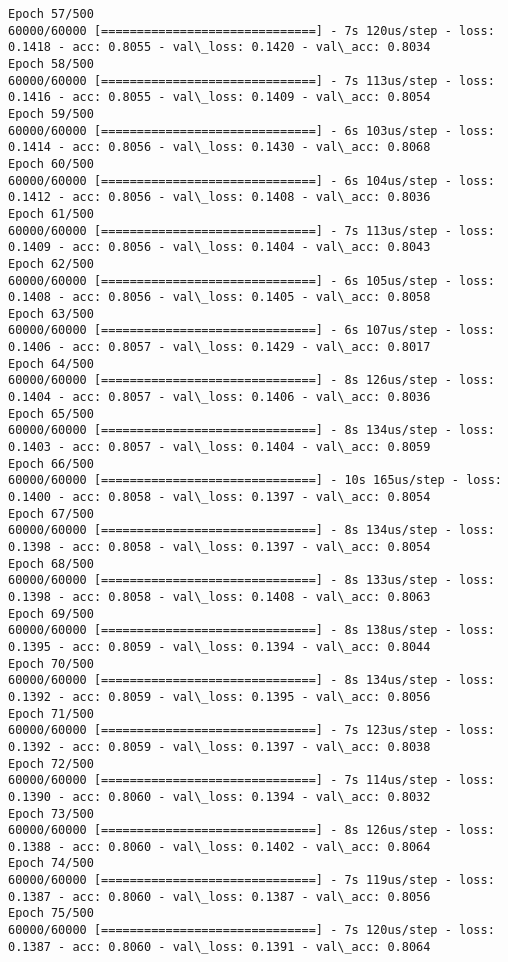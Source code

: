 \documentclass[11pt]{article}
\begin{document}
\begin{Verbatim}[commandchars=\\\{\}]
Epoch 57/500
60000/60000 [==============================] - 7s 120us/step - loss: 0.1418 - acc: 0.8055 - val\_loss: 0.1420 - val\_acc: 0.8034
Epoch 58/500
60000/60000 [==============================] - 7s 113us/step - loss: 0.1416 - acc: 0.8055 - val\_loss: 0.1409 - val\_acc: 0.8054
Epoch 59/500
60000/60000 [==============================] - 6s 103us/step - loss: 0.1414 - acc: 0.8056 - val\_loss: 0.1430 - val\_acc: 0.8068
Epoch 60/500
60000/60000 [==============================] - 6s 104us/step - loss: 0.1412 - acc: 0.8056 - val\_loss: 0.1408 - val\_acc: 0.8036
Epoch 61/500
60000/60000 [==============================] - 7s 113us/step - loss: 0.1409 - acc: 0.8056 - val\_loss: 0.1404 - val\_acc: 0.8043
Epoch 62/500
60000/60000 [==============================] - 6s 105us/step - loss: 0.1408 - acc: 0.8056 - val\_loss: 0.1405 - val\_acc: 0.8058
Epoch 63/500
60000/60000 [==============================] - 6s 107us/step - loss: 0.1406 - acc: 0.8057 - val\_loss: 0.1429 - val\_acc: 0.8017
Epoch 64/500
60000/60000 [==============================] - 8s 126us/step - loss: 0.1404 - acc: 0.8057 - val\_loss: 0.1406 - val\_acc: 0.8036
Epoch 65/500
60000/60000 [==============================] - 8s 134us/step - loss: 0.1403 - acc: 0.8057 - val\_loss: 0.1404 - val\_acc: 0.8059
Epoch 66/500
60000/60000 [==============================] - 10s 165us/step - loss: 0.1400 - acc: 0.8058 - val\_loss: 0.1397 - val\_acc: 0.8054
Epoch 67/500
60000/60000 [==============================] - 8s 134us/step - loss: 0.1398 - acc: 0.8058 - val\_loss: 0.1397 - val\_acc: 0.8054
Epoch 68/500
60000/60000 [==============================] - 8s 133us/step - loss: 0.1398 - acc: 0.8058 - val\_loss: 0.1408 - val\_acc: 0.8063
Epoch 69/500
60000/60000 [==============================] - 8s 138us/step - loss: 0.1395 - acc: 0.8059 - val\_loss: 0.1394 - val\_acc: 0.8044
Epoch 70/500
60000/60000 [==============================] - 8s 134us/step - loss: 0.1392 - acc: 0.8059 - val\_loss: 0.1395 - val\_acc: 0.8056
Epoch 71/500
60000/60000 [==============================] - 7s 123us/step - loss: 0.1392 - acc: 0.8059 - val\_loss: 0.1397 - val\_acc: 0.8038
Epoch 72/500
60000/60000 [==============================] - 7s 114us/step - loss: 0.1390 - acc: 0.8060 - val\_loss: 0.1394 - val\_acc: 0.8032
Epoch 73/500
60000/60000 [==============================] - 8s 126us/step - loss: 0.1388 - acc: 0.8060 - val\_loss: 0.1402 - val\_acc: 0.8064
Epoch 74/500
60000/60000 [==============================] - 7s 119us/step - loss: 0.1387 - acc: 0.8060 - val\_loss: 0.1387 - val\_acc: 0.8056
Epoch 75/500
60000/60000 [==============================] - 7s 120us/step - loss: 0.1387 - acc: 0.8060 - val\_loss: 0.1391 - val\_acc: 0.8064

\end{Verbatim}
\end{document}
